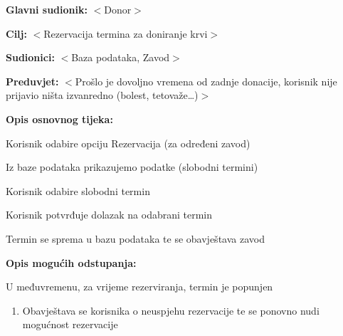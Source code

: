 					\noindent {}
					\begin{packed_item}
						
						\item \textbf{Glavni sudionik:} $<$Donor$>$
						\item \textbf{Cilj:} $<$Rezervacija termina za doniranje krvi$>$
						\item \textbf{Sudionici:} $<$Baza podataka, Zavod$>$
						\item \textbf{Preduvjet:} $<$Prošlo je dovoljno vremena od zadnje donacije, korisnik nije prijavio ništa izvanredno (bolest, tetovaže…)$>$
						\item \textbf{Opis osnovnog tijeka:}
						
						\begin{packed_enum}
							
							\item Korisnik odabire opciju Rezervacija (za određeni zavod)
							\item Iz baze podataka prikazujemo podatke (slobodni termini)
							\item Korisnik odabire slobodni termin
							\item Korisnik potvrđuje dolazak na odabrani termin
							\item Termin se sprema u bazu podataka te se obavještava zavod
							
						\end{packed_enum}
						
						\item \textbf{Opis mogućih odstupanja:}
						
						\begin{packed_item}
							
							\item[4.a] U međuvremenu, za vrijeme rezerviranja, termin je popunjen
							\begin{enumerate}
								\item Obavještava se korisnika o neuspjehu rezervacije te se ponovno nudi mogućnost rezervacije
							\end{enumerate}
							
						\end{packed_item}
						
					\end{packed_item}
					
